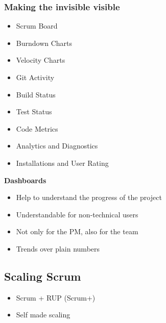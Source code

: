 \subsubsection{Making the invisible visible}
\begin{itemize}
    \item Scrum Board
    \item Burndown Charts
    \item Velocity Charts
    \item Git Activity
    \item Build Status
    \item Test Status
    \item Code Metrics
    \item Analytics and Diagnostics
    \item Installations and User Rating
\end{itemize}
\textbf{Dashboards}
\begin{itemize}
    \item Help to understand the progress of the project
    \item Understandable for non-technical users
    \item Not only for the PM, also for the team
    \item Trends over plain numbers
\end{itemize}

\subsection{Scaling Scrum}
\begin{itemize}
    \item Scrum + RUP (Scrum+)
    \item Self made scaling
\end{itemize}

